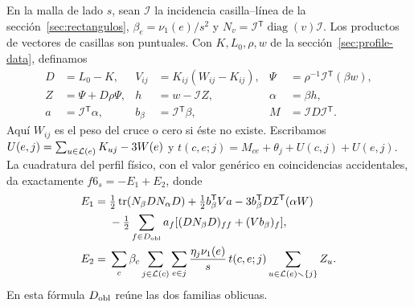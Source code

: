 \begin{lema}\label{lem:f6}
En la malla de lado \(s\), sean \(\mathcal I{}\) la incidencia casilla--línea de la
sección~\ref{sec:rectangulos}, \(\beta_e=\nu_1(e)/s^2\) y
\(N_v=\mathcal I{}^{\mathsf T}\operatorname{diag}(v)\mathcal I{}\). Los productos de vectores de casillas
son puntuales. Con \(K,L_0,\rho,w\) de la sección~\ref{sec:profile-data}, definamos
\begin{align*}
 D&=L_0-K,& V_{ij}&=K_{ij}(W_{ij}-K_{ij}),&
 \Psi&=\rho^{-1}\mathcal I{}^{\mathsf T}(\beta w),\\
 Z&=\Psi+D\rho\Psi,& h&=w-\mathcal I{}Z,& \alpha&=\beta h,\\
 a&=\mathcal I{}^{\mathsf T}\alpha,& b_\beta&=\mathcal I{}^{\mathsf T}\beta,&
 M&=\mathcal I{}D\mathcal I{}^{\mathsf T}.
\end{align*}
Aquí \(W_{ij}\) es el peso del cruce o cero si éste no existe.
Escribamos \(U(e,j)=\sum_{u\in \mathcal L(e)} K_{uj}-3W(e)\) y
\(t(c,e;j)=M_{ce}+\theta_j+U(c,j)+U(e,j)\).
La cuadratura del perfil físico, con el valor genérico en coincidencias accidentales,
da exactamente \(f6_s=-E_1+E_2\), donde
\begin{align*}
 E_1={}&\tfrac12\operatorname{tr}(N_\beta D N_\alpha D)
       +\tfrac12 b_\beta^{\mathsf T}Va-3b_\beta^{\mathsf T}D\mathcal I{}^{\mathsf T}(\alpha W)\\
     &-\tfrac12\sum_{f\in D_{\rm obl}}a_f
         [(D N_\beta D)_{ff}+(Vb_\beta)_f],\\
 E_2={}&\sum_c\beta_c\sum_{j\in \mathcal L(c)}\sum_{e\in j}
     \frac{\eta_j\nu_1(e)}s\,t(c,e;j)
     \sum_{u\in \mathcal L(e)\smallsetminus\{j\}}Z_u .
\end{align*}
En esta fórmula \(D_{\rm obl}\) reúne las dos familias oblicuas.
\end{lema}
